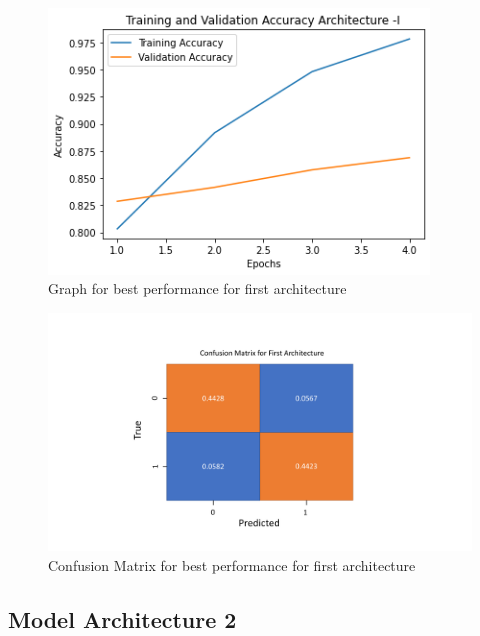 \documentclass{article}
\begin{document}
\begin{figure}[H]
    \centering
    \includegraphics[width=0.9\textwidth]{Arch1Losses.png}
    \caption{Graph for best performance for first architecture}
    \label{fig:LossArch1}
\end{figure}
\begin{figure}[H]
    \centering
    \includegraphics[width=\textwidth]{Confusion_matrix_First_Arch.pdf}
    \caption{Confusion Matrix for best performance for first architecture}
    \label{fig:Conf}
\end{figure}

\subsection{Model Architecture 2}
\end{document}
